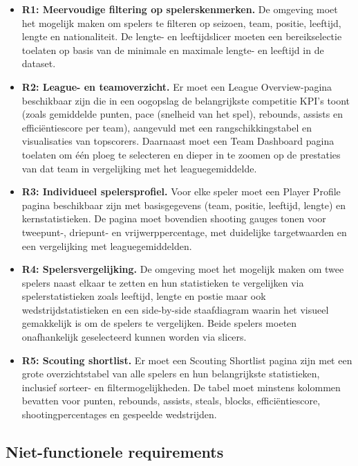 \begin{itemize}
  \item \textbf{R1: Meervoudige filtering op spelerskenmerken.} De omgeving moet het mogelijk maken om spelers te filteren op seizoen, team, positie, leeftijd, lengte en nationaliteit. De lengte- en leeftijdslicer moeten een bereikselectie toelaten op basis van de minimale en maximale lengte- en leeftijd in de dataset.

  \item \textbf{R2: League- en teamoverzicht.} Er moet een League Overview-pagina beschikbaar zijn die in een oogopslag de belangrijkste competitie KPI's toont (zoals gemiddelde punten, pace (snelheid van het spel), rebounds, assists en efficiëntiescore per team), aangevuld met een rangschikkingstabel en visualisaties van topscorers. Daarnaast moet een Team Dashboard pagina toelaten om één ploeg te selecteren en dieper in te zoomen op de prestaties van dat team in vergelijking met het leaguegemiddelde.

  \item \textbf{R3: Individueel spelersprofiel.} Voor elke speler moet een Player Profile pagina beschikbaar zijn met basisgegevens (team, positie, leeftijd, lengte) en kernstatistieken. De pagina moet bovendien shooting gauges tonen voor tweepunt-, driepunt- en vrijwerppercentage, met duidelijke targetwaarden en een vergelijking met leaguegemiddelden.

  \item \textbf{R4: Spelersvergelijking.} De omgeving moet het mogelijk maken om twee spelers naast elkaar te zetten en hun statistieken te vergelijken via spelerstatistieken zoals leeftijd, lengte en postie maar ook wedstrijdstatistieken en een side-by-side staafdiagram waarin het visueel gemakkelijk is om de spelers te vergelijken. Beide spelers moeten onafhankelijk geselecteerd kunnen worden via slicers.

  \item \textbf{R5: Scouting shortlist.} Er moet een Scouting Shortlist pagina zijn met een grote overzichtstabel van alle spelers en hun belangrijkste statistieken, inclusief sorteer- en filtermogelijkheden. De tabel moet minstens kolommen bevatten voor punten, rebounds, assists, steals, blocks, efficiëntiescore, shootingpercentages en gespeelde wedstrijden.
\end{itemize}

\subsection{Niet-functionele requirements}


